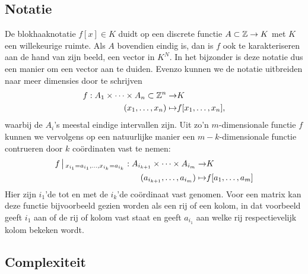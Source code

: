 \subsection{Notatie}
De blokhaaknotatie $f[x]\in K$ duidt op een discrete functie $A\subset \mathbb{Z}\to K$ met $K$ een willekeurige ruimte.
Als $A$ bovendien eindig is, dan is $f$ ook te karakteriseren aan de hand van zijn beeld, een vector in $K^{N}$.
In het bijzonder is deze notatie dus een manier om een vector aan te duiden.
Evenzo kunnen we de notatie uitbreiden naar meer dimensies door te schrijven
\begin{equation*}
\begin{split}
f: A_1\times \cdots \times A_n\subset \mathbb{Z}^n \to& K \\
       (x_1,\ldots,x_n) \mapsto& f[x_1,\ldots,x_n],
\end{split}
\end{equation*}
waarbij de $A_i$'s meestal eindige intervallen zijn. 
Uit zo'n $m$-dimensionale functie $f$ kunnen we vervolgens op een natuurlijke manier een $m-k$-dimensionale
functie contrueren door $k$ co\"ordinaten vast te nemen:
\begin{equation*}
\begin{split}
f\,\big|\,_{x_{i_1}=a_{i_1},\ldots,x_{i_k}=a_{i_k}}: A_{i_{k+1}}\times\cdots\times A_{i_{m}} \to& K \\
(a_{i_{k+1}},\ldots,a_{i_{m}}) \mapsto& f[a_1,\ldots,a_m]
\end{split}
\end{equation*}
Hier zijn $i_1$'de tot en met de $i_k$'de co\"ordinaat vast genomen. Voor een matrix kan deze functie
bijvoorbeeld gezien worden als een rij of een kolom, in dat voorbeeld geeft $i_1$ aan of de rij of kolom
vast staat en geeft $a_{i_1}$ aan welke rij respectievelijk kolom bekeken wordt.

\subsection{Complexiteit}

